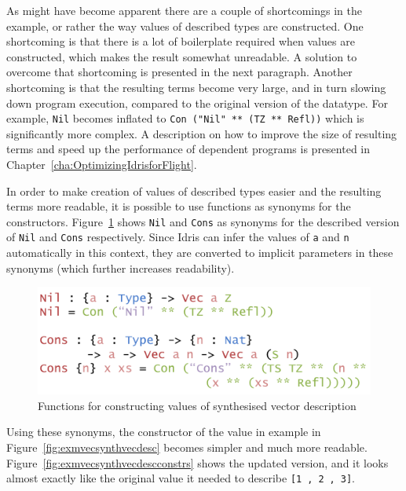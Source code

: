\documentclass{ituthesis}
\newcommand{\ttconstructor}[1]{\textcolor{constructor-color}{\texttt{#1}}}
\newcommand{\ttdec}[1]{\textcolor{declared-var-color}{\texttt{#1}}}
\newcommand{\ttvar}[1]{\textcolor{local-var-color}{\texttt{#1}}}
\newcommand{\ttliteral}[1]{\textcolor{literal-color}{\texttt{#1}}}
\theoremstyle{break}
\begin{document}
As might have become apparent there are a couple of shortcomings in the example, or rather the way values of described types are constructed.
One shortcoming is that there is a lot of boilerplate required when values are constructed, which makes the result somewhat unreadable.
A solution to overcome that shortcoming is presented in the next paragraph. Another shortcoming is that the resulting terms become very large, and in turn slowing down program execution, compared to the original
version of the datatype. For example, \ttconstructor{Nil} becomes inflated to \ttconstructor{Con~(}\ttliteral{"Nil"}~\ttconstructor{** (TZ ** Refl))} which is significantly more complex. A description on how to improve the size of resulting terms and
speed up the performance of dependent programs is presented in Chapter~\ref{cha:OptimizingIdrisforFlight}.

In order to make creation of values of described types easier and the resulting terms more readable, it is possible to use functions as synonyms for the constructors.
Figure~\ref{fig:funcconstrsynthvec} shows \ttdec{Nil} and \ttdec{Cons} as synonyms for the described version of \ttconstructor{Nil} and \ttconstructor{Cons} respectively.
Since Idris can infer the values of \ttvar{a} and \ttvar{n} automatically in this context, they are converted to implicit parameters in these synonyms (which further increases readability).

\begin{figure}[ht]
\begin{center}
    \includegraphics[scale=0.5]{Figures/VectorSynthesisedConstructors.png}
\end{center}
\caption{Functions for constructing values of synthesised vector description}
\label{fig:funcconstrsynthvec}
\end{figure}

Using these synonyms, the constructor of the value in example in Figure~\ref{fig:exmvecsynthvecdesc} becomes simpler and much more readable. Figure~\ref{fig:exmvecsynthvecdescconstrs} shows the updated version,
and it looks almost exactly like the original value it needed to describe \ttconstructor{[}\ttliteral{1}~\ttconstructor{,}~\ttliteral{2}~\ttconstructor{,}~\ttliteral{3}\ttconstructor{]}.
\end{document}

